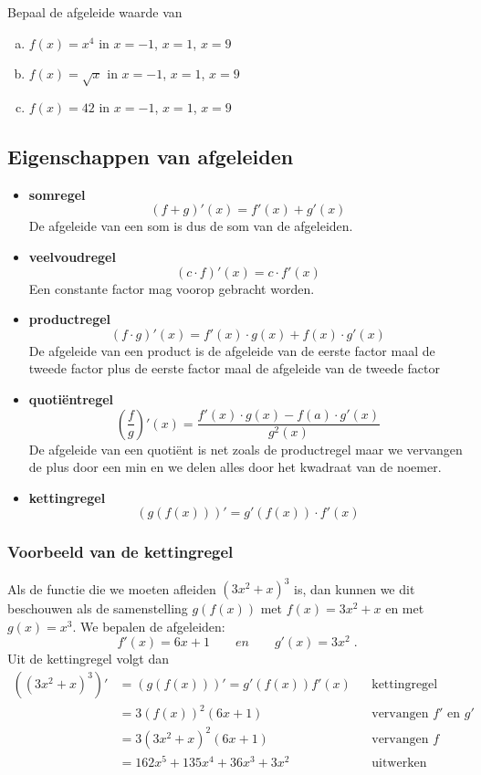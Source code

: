 \documentclass[12pt]{article}
\newenvironment{kader}
{
  \begin{mdframed}[nobreak=true]
  }{%
  \end{mdframed}
}
\begin{document}
\begin{oefening}
Bepaal de afgeleide waarde van
\begin{enumerate}[(a)]
  \item $f(x)=x^4$ in $x=-1$, $x=1$, $x=9$
  \item $f(x)=\sqrt{x}$ in $x=-1$, $x=1$, $x=9$
  \item $f(x)=42$ in $x=-1$, $x=1$, $x=9$
\end{enumerate}
\end{oefening}

\subsection{Eigenschappen van afgeleiden}

\begin{kader}
  \begin{itemize}
  \item {\bf somregel}
    $$(f+g)'(x)=f'(x)+g'(x)$$
    De afgeleide van een som is dus de som van de afgeleiden.
  \item {\bf veelvoudregel}
    $$(c\cdot f)'(x) = c\cdot f'(x)$$
    Een constante factor mag voorop gebracht worden.
  \item {\bf productregel}
    $$(f\cdot g)'(x)=f'(x)\cdot g(x) + f(x)\cdot g'(x)$$
    De afgeleide van een product is de afgeleide van de eerste factor maal de tweede factor plus de eerste factor maal de afgeleide van de tweede factor
  \item {\bf quotiëntregel}
    $$\left(\dfrac{f}{g}\right)'(x)=\dfrac{f'(x)\cdot g(x)-f(a)\cdot g'(x)}{g^2(x)}$$
    De afgeleide van een quotiënt is net zoals de productregel maar we vervangen de plus door een min en we delen alles door het kwadraat van de noemer.
  \item {\bf kettingregel}
    $$\left(g\left(f\left(x\right)\right)\right)'=g'(f(x))\cdot f'(x)$$
  \end{itemize}
\end{kader}

\subsubsection*{Voorbeeld van de kettingregel}

Als de functie die we moeten afleiden $(3x^2+x)^3$ is, dan kunnen we dit beschouwen als de samenstelling $g(f(x))$ met $f(x)=3x^2+x$ en met $g(x)=x^3$. We bepalen de afgeleiden:
$$f'(x)=6x+1 \qquad en \qquad g'(x)=3x^2\;.$$
Uit de kettingregel volgt dan
\begin{align*}
  \left((3x^2+x)^3\right)' & =\left(g\left(f\left(x\right)\right)\right)' =g'(f(x)) f'(x) &&\mbox{kettingregel}\\
                           & =3(f(x))^2 (6x+1) &&\mbox{vervangen $f'$ en $g'$}\\
                           & = 3(3x^2+x)^2(6x+1) &&\mbox{vervangen $f$}\\
                           & = 162x^5 + 135x^4 + 36x^3 + 3x^2 &&\mbox{uitwerken}
\end{align*}
\end{document}
